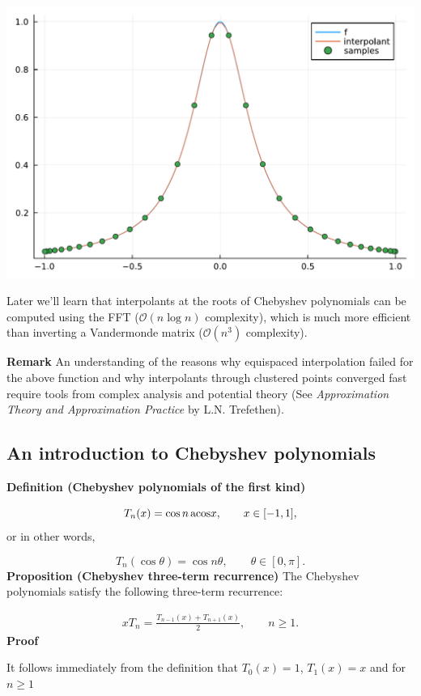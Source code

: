 \documentclass[12pt,a4paper]{article}
\begin{document}
\includegraphics[width=\linewidth]{jl_P71Faz/Chapter3_4_1.pdf}

Later we'll learn that interpolants at the roots of Chebyshev polynomials can be computed using the FFT ($\mathcal{O}(n\log n)$ complexity), which is much more efficient than inverting a Vandermonde matrix ($\mathcal{O}(n^3)$ complexity). 

\textbf{Remark}  An understanding of the reasons why equispaced interpolation failed for the above function and why interpolants through clustered points converged fast require tools from complex analysis and potential theory (See \emph{Approximation Theory and Approximation Practice} by L.N. Trefethen).

\subsection{An introduction to Chebyshev polynomials}
\textbf{Definition (Chebyshev polynomials of the first kind)}

\[
T_n(x) = \cos n\, {\rm acos} x, \qquad x \in [-1, 1],
\]
or in other words,

\[
T_n(\cos \theta) = \cos n \theta, \qquad \theta \in [0, \pi].
\]
\textbf{Proposition (Chebyshev three-term recurrence)}  The Chebyshev polynomials satisfy the following three-term recurrence:


\begin{align*}
xT_{n} = \frac{T_{n-1}(x) + T_{n+1}(x)}{2}, \qquad n \geq 1.
\end{align*}
\textbf{Proof}

It follows immediately from the definition that $T_0(x) = 1$, $T_{1}(x) = x$ and for $n \geq 1$
\end{document}
